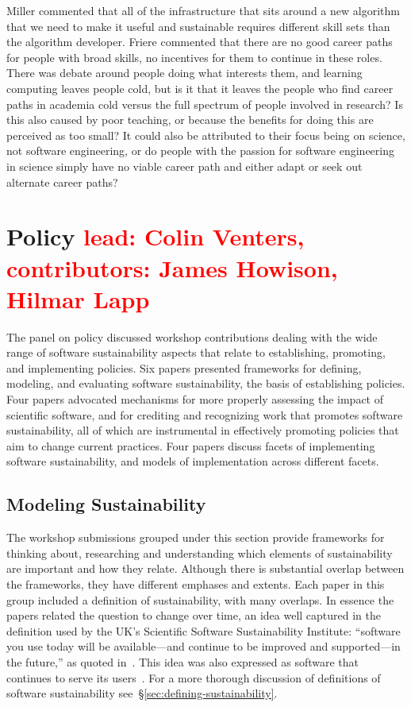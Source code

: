 \documentclass[11pt, oneside]{amsart}
\newcommand{\note}[1]{ {\textcolor{red}    { #1 }}}
\begin{document}
Miller commented that all of the infrastructure that sits around a new
algorithm that we need to make it useful and sustainable requires different
skill sets than the algorithm developer. Friere commented that there are no
good career paths for people with broad skills, no incentives for them to
continue in these roles. There was debate around people doing what interests
them, and learning computing leaves people cold, but is it that it leaves the
people who find career paths in academia cold versus the full spectrum of
people involved in research? Is this also caused by poor teaching, or because the
benefits for doing this are perceived as too small? It could also be attributed to
their focus being on science, not software engineering, or do people with
the passion for software engineering in science simply have no viable career
path and either adapt or seek out alternate career paths?

\section{Policy \note{lead: Colin Venters, contributors: James Howison, Hilmar Lapp}} \label{sec:policy}

The  panel on policy  discussed workshop
contributions dealing with the wide range of software sustainability
aspects that relate to establishing, promoting, and implementing
policies. Six papers presented frameworks for defining, modeling, and
evaluating software sustainability, the basis of establishing
policies. Four papers advocated mechanisms for more properly assessing
the impact of scientific software, and for crediting and recognizing
work that promotes software sustainability, all of which are
instrumental in effectively promoting policies that aim to change
current practices. Four papers discuss facets of implementing software
sustainability, and models of implementation across different facets.

\subsection{Modeling Sustainability}

The workshop submissions grouped under this section provide frameworks
for thinking about, researching and understanding which elements of sustainability
are important and how they relate. Although there is substantial
overlap between the frameworks, they have different emphases and
extents.  Each paper in this group included a definition of sustainability,
with many overlaps.  In essence the papers related the question to
change over time, an idea well captured in the definition used by the
UK's Scientific Software Sustainability Institute: ``software you use
today will be available---and continue to be improved and
supported---in the future,'' as quoted in~\cite{Venters_WSSSPE}. This
idea was also expressed as software that continues to serve its
users~\cite{Pierce_WSSSPE}.  For a more thorough discussion of definitions
of software sustainability see~\S\ref{sec:defining-sustainability}.
\end{document}
